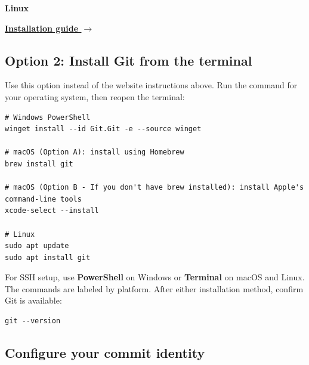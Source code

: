 \begin{tcolorbox}
\begin{minipage}[t]{0.32\linewidth}
\begin{tcolorbox}[enhanced,width=\linewidth,height=2.8cm,valign=center,colback=UTPPaleBlue!35,colframe=UTPBlue!30,boxrule=0.55pt,arc=1.5mm,left=1mm,right=1mm,top=1.5mm,bottom=1.5mm]
  \end{tcolorbox}
\end{minipage}\hfill
\begin{minipage}[t]{0.32\linewidth}
  \begin{tcolorbox}[enhanced,width=\linewidth,height=2.8cm,valign=center,colback=UTPPaleBlue!35,colframe=UTPBlue!30,boxrule=0.55pt,arc=1.5mm,left=1mm,right=1mm,top=1.5mm,bottom=1.5mm]
    \centering
    {\fontsize{23}{25}\selectfont\color{UTPBlue}\faLinux}\par\smallskip
    {\large\bfseries\color{UTPNavy}Linux}\par\smallskip
    \href{https://git-scm.com/install/linux}{\textbf{\small\color{UTPBlue}Installation guide $\rightarrow$}}
  \end{tcolorbox}
\end{minipage}
\end{tcolorbox}

\subsection{Option 2: Install Git from the terminal}

Use this option instead of the website instructions above. Run the command for your operating system, then reopen the terminal:

\begin{lstlisting}[style=utpterminal]
# Windows PowerShell
winget install --id Git.Git -e --source winget

# macOS (Option A): install using Homebrew
brew install git

# macOS (Option B - If you don't have brew installed): install Apple's command-line tools
xcode-select --install

# Linux
sudo apt update
sudo apt install git
\end{lstlisting}

For SSH setup, use \textbf{PowerShell} on Windows or \textbf{Terminal} on macOS and Linux. The commands are labeled by platform. After either installation method, confirm Git is available:

\begin{lstlisting}[style=utpterminal]
git --version
\end{lstlisting}

\subsection{Configure your commit identity}

